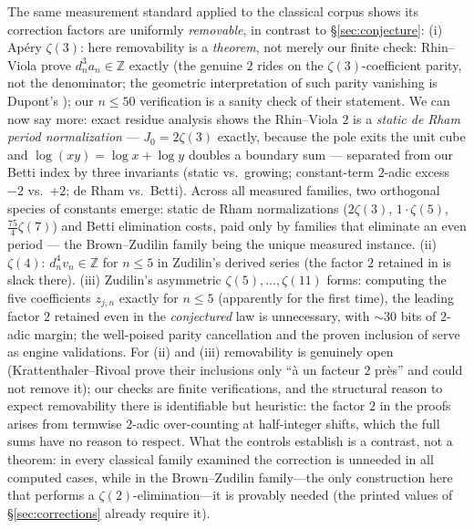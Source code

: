 \documentclass[11pt]{article}
\theoremstyle{definition}
\newcommand{\dn}[1]{d_{#1}}
\newcommand{\Z}{\mathbb{Z}}
\begin{document}
The same measurement standard applied to the classical corpus shows its
correction factors are uniformly \emph{removable}, in contrast to
\S\ref{sec:conjecture}:
(i) Ap\'ery $\zeta(3)$: here removability is a \emph{theorem}, not
merely our finite check: Rhin--Viola \cite[Thm.~2.1]{RV3} prove
$\dn{n}^3a_n\in\Z$ exactly (the genuine $2$ rides on the
$\zeta(3)$-coefficient parity, not the denominator; the geometric
interpretation of such parity vanishing is Dupont's
\cite[Thm.~1.2]{Dupont}); our $n\le50$
verification is a sanity check of their statement. We can now say more:
exact residue analysis shows the Rhin--Viola $2$ is a \emph{static de
Rham period normalization} --- $J_0=2\zeta(3)$ exactly, because the
pole exits the unit cube and $\log(xy)=\log x+\log y$ doubles a
boundary sum --- separated from our Betti index by three invariants
(static vs.\ growing; constant-term $2$-adic excess $-2$ vs.\ $+2$;
de Rham vs.\ Betti). Across all measured families, two orthogonal
species of constants emerge: static de Rham normalizations
($2\zeta(3)$, $1\cdot\zeta(5)$, $\tfrac{75}{4}\zeta(7)$) and Betti
elimination costs, paid only by families that eliminate an even
period --- the Brown--Zudilin family being the unique measured
instance.
(ii) $\zeta(4)$: $\dn{n}^4v_n\in\Z$ for $n\le5$ in Zudilin's derived
series (the factor $2$ retained in \cite[Th\'eor\`eme 3]{KR} is slack
there).
(iii) Zudilin's asymmetric $\zeta(5),\dots,\zeta(11)$ forms: computing
the five coefficients $z_{j,n}$ exactly for $n\le5$ (apparently for the
first time), the leading factor $2$ retained even in the
\emph{conjectured} law \cite[eq.~(17.1)]{KR} is unnecessary, with
$\sim30$ bits of $2$-adic margin; the well-poised parity cancellation
and the proven inclusion of \cite{KR} serve as engine validations. For (ii) and (iii)
removability is genuinely open (Krattenthaler--Rivoal prove their
inclusions only ``\`a un facteur $2$ pr\`es'' and could not remove it);
our checks are finite verifications, and the structural reason to expect
removability there is identifiable but heuristic: the factor $2$ in the
proofs arises from termwise $2$-adic over-counting at half-integer
shifts, which the full sums have no reason to respect. What the controls
establish is a contrast, not a theorem: in every classical family
examined the correction is unneeded in all computed cases, while in the
Brown--Zudilin family---the only construction here that performs a
$\zeta(2)$-elimination---it is provably needed (the printed values of
\S\ref{sec:corrections} already require it).
\end{document}
